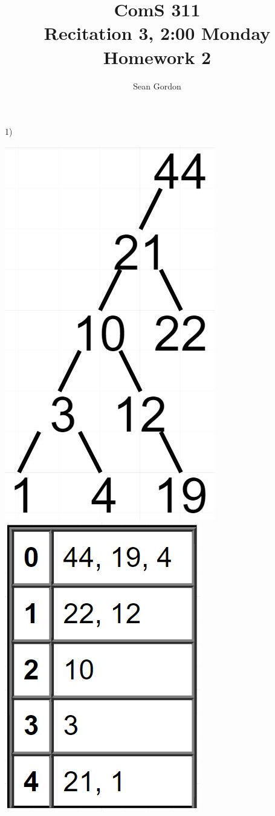 \documentclass[12pt]{article}
\title{ComS 311\\Recitation 3, 2:00 Monday\\Homework 2}
\author{Sean Gordon}
\begin{document}
\maketitle


1)\begin{multicols}{2}
\includegraphics[scale=.4]{HW2_Pt1a}\\
\columnbreak
\includegraphics[scale=.5]{HW2_Pt1b}\\
\end{multicols} 
\end{document}
